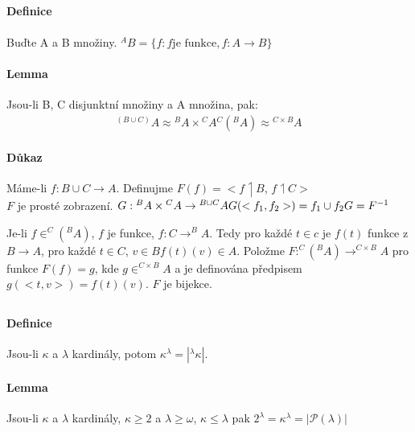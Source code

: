 \documentclass[a4paper,12pt,titlepage]{article}
\begin{document}
\subsection{}
\setcounter{equation}{0}
\paragraph{Definice}
Buďte A a B množiny. $^A B = \{f: f \text{je funkce}, f: A \to B \}$
\paragraph{Lemma}
Jsou-li B, C disjunktní množiny a A množina, pak:
\begin{align}
	{}^{(B \cup C)} A \approx {}^B A \times {}^C A
	{}^C ( {}^B A ) \approx {}^{C\times B} A
\end{align}
\paragraph{Důkaz}
Máme-li $f: B \cup C \to A$. Definujme $F(f) = < f \upharpoonleft B$, $f
\upharpoonleft C >$ \\
$F$ je prosté zobrazení. $G: {}^BA \times {}^CA \to {}^{B\cup C}A \\
G(<f_1, f_2>) = f_1 \cup f_2 \\
G = F^{-1}$

Je-li $f \in ^C(^B A)$, $f$ je funkce, $f : C \to ^B A$. Tedy pro každé $t \in c$ je
$f(t)$ funkce z $B \to A$, pro každé $t \in C$, $v \in B f(t)(v) \in A$. Položme $F:
^C(^B A) \to ^{C \times B} A$ pro funkce $F(f) = g$, kde $g \in ^{C \times B} A$ a je
definována předpisem $g(<t, v>) = f(t)(v)$. $F$ je bijekce.




\subsection{}
\setcounter{equation}{0}
\paragraph{Definice}
Jsou-li $\kappa$ a $\lambda$ kardinály, potom $\kappa^\lambda = \left| ^\lambda
\kappa \right|$.

\paragraph{Lemma}
Jsou-li $\kappa$ a $\lambda$ kardinály, $\kappa \ge 2$ a $\lambda \ge \omega$,
$\kappa \le \lambda$ pak
$2^\lambda = \kappa^\lambda = |\mathcal{P}(\lambda)|$
\end{document}
